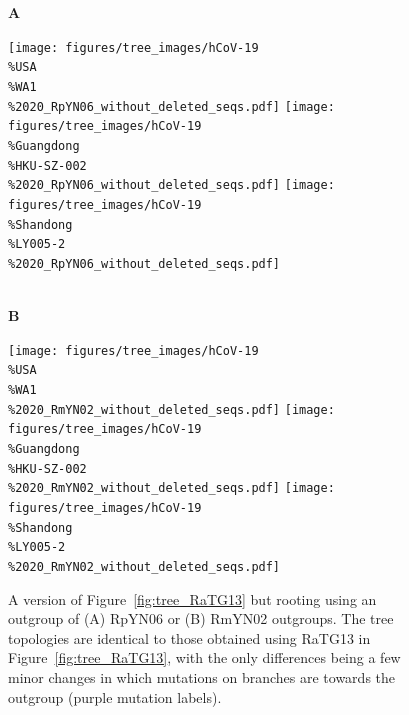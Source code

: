 \documentclass[9pt,twocolumn,twoside]{gsajnl_modified}
\begin{document}
 \begin{figure}[h!]
 {\bf \LARGE A} \\
 \centerline{
 \texttt{[image: figures/tree\_images/hCoV-19\\\%USA\\\%WA1\\\%2020\_RpYN06\_without\_deleted\_seqs.pdf]}
 \hspace{0.04\linewidth}
 \texttt{[image: figures/tree\_images/hCoV-19\\\%Guangdong\\\%HKU-SZ-002\\\%2020\_RpYN06\_without\_deleted\_seqs.pdf]}
  \hspace{0.04\linewidth}
 \texttt{[image: figures/tree\_images/hCoV-19\\\%Shandong\\\%LY005-2\\\%2020\_RpYN06\_without\_deleted\_seqs.pdf]}
 }
 \\
  {\bf \LARGE B} \\
 \centerline{
 \texttt{[image: figures/tree\_images/hCoV-19\\\%USA\\\%WA1\\\%2020\_RmYN02\_without\_deleted\_seqs.pdf]}
 \hspace{0.04\linewidth}
 \texttt{[image: figures/tree\_images/hCoV-19\\\%Guangdong\\\%HKU-SZ-002\\\%2020\_RmYN02\_without\_deleted\_seqs.pdf]}
  \hspace{0.04\linewidth}
 \texttt{[image: figures/tree\_images/hCoV-19\\\%Shandong\\\%LY005-2\\\%2020\_RmYN02\_without\_deleted\_seqs.pdf]}
 }
 \caption{
 A version of Figure~\ref{fig:tree_RaTG13} but rooting using an outgroup of (A) RpYN06 or (B) RmYN02 outgroups.
 The tree topologies are identical to those obtained using RaTG13 in Figure~\ref{fig:tree_RaTG13}, with the only differences being a few minor changes in which mutations on branches are towards the outgroup (purple mutation labels).
\label{suppfig:tree_RpYN06_RmYN02}
 }
 \end{figure}
\end{document}
